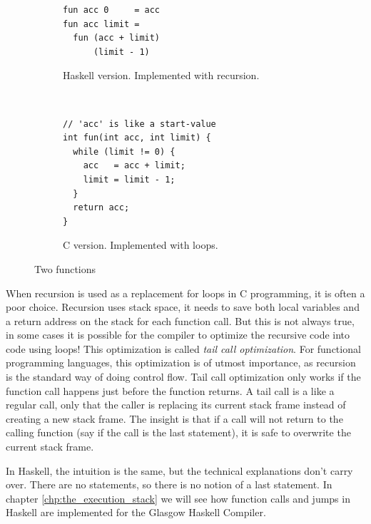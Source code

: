 \begin{figure}
\begin{mdframed}
        \begin{subfigure}[t]{0.5\textwidth}
            \begin{verbatim}
fun acc 0     = acc
fun acc limit =
  fun (acc + limit)
      (limit - 1)
            \end{verbatim}
            \caption{Haskell version. Implemented with recursion.}
        \end{subfigure}
        ~ %
        \begin{subfigure}[t]{0.5\textwidth}
          \begin{verbatim}
// 'acc' is like a start-value
int fun(int acc, int limit) {
  while (limit != 0) {
    acc   = acc + limit;
    limit = limit - 1;
  }
  return acc;
}
          \end{verbatim}
          \caption{C version. Implemented with loops.}
        \end{subfigure}
        \caption{Two functions}\label{fig:tail_call_fun}
\end{mdframed}
\end{figure}

When recursion is used as a replacement for loops in C programming, it
is often a poor choice. Recursion uses stack space,
it needs to save both local variables and a return address on the stack
for each function call. But this is not always true, in some cases it
is possible for the compiler to optimize the recursive code into code
using loops! This optimization is called \emph{tail call optimization}.
For functional programming languages, this optimization is of utmost
importance, as recursion is the standard way of doing control flow. Tail
call optimization only works if the function call happens just before the function
returns. A tail call is a like a regular call, only that the caller is
replacing its current stack frame instead of creating a new stack frame.
The insight is that if a call will not return to the calling function (say
if the call is the last statement), it is safe to overwrite the current
stack frame.

In Haskell, the intuition is the same, but the technical explanations
don't carry over. There are no statements, so there is no notion of a
last statement. In chapter \ref{chp:the_execution_stack} we will see how
function calls and jumps in Haskell are implemented for the Glasgow
Haskell Compiler.

